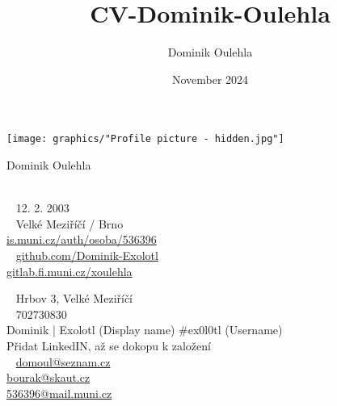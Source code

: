 \documentclass{modernsimplecv}
\title{CV-Dominik-Oulehla}
\author{Dominik Oulehla}
\date{November 2024}
\begin{document}
\thispagestyle{empty}




\begin{minipage}[t]{0.21\textwidth}
\vspace{0pt} %
\texttt{[image: graphics/"Profile picture - hidden.jpg"]}\hspace{1em}
\end{minipage}
\hfill
\begin{minipage}[t]{0.77\textwidth}
\vspace{0pt} %
\begin{shaded*}

\begin{minipage}[t]{0.4\textwidth}
\vspace{0pt} %
{\par\centering\huge\textsf{Dominik Oulehla}} \\[0.3cm]
\faBirthdayCake~ 12. 2. 2003 \\
\faMapMarker~ Velké Meziříčí / Brno \\

{\small
 \protect\url{is.muni.cz/auth/osoba/536396} \\
\faGithub~ \protect\url{github.com/Dominik-Exolotl} \\
 \protect\url{gitlab.fi.muni.cz/xoulehla}
}
\end{minipage}\hfill
\begin{minipage}[t]{0.55\textwidth}
\vspace{0pt} %
\faEnvelopeO~ Hrbov 3, Velké Meziříčí \\
\faPhone~ 702730830 \\
 Dominik | Exolotl \tiny{(Display name)}\normalsize{ \#ex0l0tl} \tiny{(Username)} \normalsize\\
 \small{Přidat LinkedIN, až se dokopu k založení} \normalsize \\[0.175cm]

\large
\faAt~ \protect\url{domoul@seznam.cz}\\
 \protect\url{bourak@skaut.cz} \\
 \protect\url{536396@mail.muni.cz} \normalsize\\
\end{minipage}
\hfill
\end{shaded*}
\end{minipage}\\[15pt]
\end{document}
